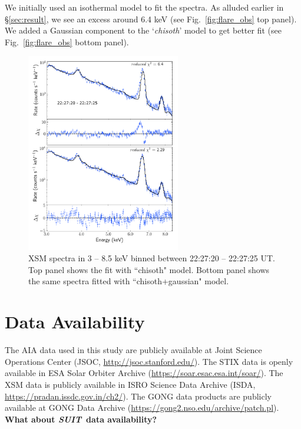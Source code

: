 \documentclass[lineno, pdflatex,sn-mathphys-ay]{sn-jnl}%
\newcommand{\suit}{{\it{SUIT}}}
\begin{document}
We initially used an isothermal model to fit the spectra. As alluded earlier in \S\ref{sec:result}, we see an excess around 6.4 keV (see Fig.~\ref{fig:flare_obs} top panel). We added a Gaussian component to the `{\it chisoth}' model to get better fit (see Fig.~\ref{fig:flare_obs} bottom panel).

\begin{figure}
    \centering
    \includegraphics[trim={0.5cm 1cm 0.5cm 0.7cm}, clip, width=0.6\textwidth]{xsm_fit.pdf}
    \caption{XSM spectra in 3 {--} 8.5 keV binned between 22:27:20 {--} 22:27:25 UT. Top panel shows the fit with ``chisoth" model. Bottom panel shows the same spectra fitted with ``chisoth+gaussian" model.}
    \label{fig:xsm_fit}
\end{figure}

\section*{Data Availability}
The AIA data used in this study are publicly available at Joint Science Operations Center (JSOC, \href{http://jsoc.stanford.edu/}{http://jsoc.stanford.edu/}). The STIX data is openly available in ESA Solar Orbiter Archive (\href{https://soar.esac.esa.int/soar/}{https://soar.esac.esa.int/soar/}). The XSM data is publicly available in ISRO Science Data Archive (ISDA, \href{https://pradan.issdc.gov.in/ch2/}{https://pradan.issdc.gov.in/ch2/}). The GONG data products are publicly available at GONG Data Archive (\href{https://gong2.nso.edu/archive/patch.pl}{https://gong2.nso.edu/archive/patch.pl}). {\bf What about \suit~data availability?}
\end{document}
